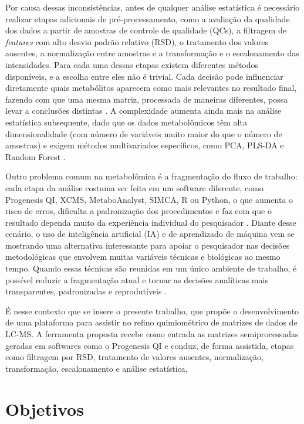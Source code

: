 Por causa dessas inconsistências, antes de qualquer análise estatística é necessário realizar etapas adicionais de pré-processamento, como a avaliação da qualidade dos dados a partir de amostras de controle de qualidade (QCs), a filtragem de \textit{features} com alto desvio padrão relativo (RSD), o tratamento dos valores ausentes, a normalização entre amostras e a transformação e o escalonamento das intensidades. Para cada uma dessas etapas existem diferentes métodos disponíveis, e a escolha entre eles não é trivial. Cada decisão pode influenciar diretamente quais metabólitos aparecem como mais relevantes no resultado final, fazendo com que uma mesma matriz, processada de maneiras diferentes, possa levar a conclusões distintas \cite{vandenberg2006centering}. A complexidade aumenta ainda mais na análise estatística subsequente, dado que os dados metabolômicos têm alta dimensionalidade (com número de variáveis muito maior do que o número de amostras) e exigem métodos multivariados específicos, como PCA, PLS-DA e Random Forest \cite{worley2013multivariate}.
 
Outro problema comum na metabolômica é a fragmentação do fluxo de trabalho: cada etapa da análise costuma ser feita em um software diferente, como Progenesis QI, XCMS, MetaboAnalyst, SIMCA, R ou Python, o que aumenta o risco de erros, dificulta a padronização dos procedimentos e faz com que o resultado dependa muito da experiência individual do pesquisador \cite{weber2017computational}. Diante desse cenário, o uso de inteligência artificial (IA) e de aprendizado de máquina vem se mostrando uma alternativa interessante para apoiar o pesquisador nas decisões metodológicas que envolvem muitas variáveis técnicas e biológicas ao mesmo tempo. Quando essas técnicas são reunidas em um único ambiente de trabalho, é possível reduzir a fragmentação atual e tornar as decisões analíticas mais transparentes, padronizadas e reprodutíveis \cite{sen2021deep}.
 
É nesse contexto que se insere o presente trabalho, que propõe o desenvolvimento de uma plataforma para assistir no refino quimiométrico de matrizes de dados de LC-MS. A ferramenta proposta recebe como entrada as matrizes semiprocessadas geradas em softwares como o Progenesis QI e conduz, de forma assistida, etapas como filtragem por RSD, tratamento de valores ausentes, normalização, transformação, escalonamento e análise estatística.

\section{Objetivos}

